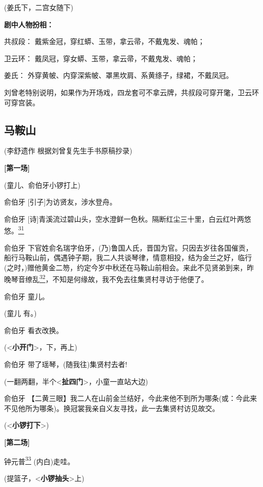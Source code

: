 (姜氏下，二宫女随下)

\textbf{剧中人物扮相：}

共叔段： 戴紫金冠，穿红蟒、玉带，拿云帚，不戴鬼发、魂帕；

卫云环： 戴凤冠，穿女蟒、玉带，拿云帚，不戴鬼发、魂帕；

姜氏： 外穿黄帔、内穿深紫帔、罩黑坎肩、系黄绦子，绿裙，不戴凤冠。

刘曾老特别说明，如果作为开场戏，四龙套可不拿云牌，共叔段可穿开氅，卫云环可穿宫装。

\newpage
\hypertarget{ux9a6cux978dux5c71}{%
\subsection{马鞍山}\label{ux9a6cux978dux5c71}}

(李舒遗作 根据刘曾复先生手书原稿抄录)

\textbf{{[}第一场{]}}

(童儿、俞伯牙小锣打上)

俞伯牙 {[}引子{]}为访贤友，涉水登舟。

俞伯牙
{[}诗{]}青溪流过碧山头，空水澄鲜一色秋。隔断红尘三十里，白云红叶两悠悠。\protect\hyperlink{fn31}{\textsuperscript{31}}

俞伯牙
下官姓俞名瑞字伯牙，(乃)鲁国人氏，晋国为官。只因去岁往各国催贡，船行马鞍山前，偶遇钟子期，我二人共谈琴律，情意相投，结为金兰之好，临行(之时，)赠他黄金二笏，约定今岁中秋还在马鞍山前相会。来此不见贤弟到来，昨晚琴音缭乱\protect\hyperlink{fn32}{\textsuperscript{32}}，不知是何缘故，我不免去往集贤村寻访于他便了。

俞伯牙 童儿。

(童儿 有。)

俞伯牙 看衣改换。

(\textless{}\textbf{小开门}\textgreater{}，下，再上)

俞伯牙 带了瑶琴，(随我往)集贤村去者!

(一翻两翻，半个\textless{}\textbf{扯四门}\textgreater{}，小童一直站大边)

俞伯牙
【二黄三眼】我二人在山前金兰结好，今此来他不到所为哪条(或：今此来不见他所为哪条)。换冠裳我亲自义友寻找，此一去集贤村访见故交。

(\textless{}\textbf{小锣打下}\textgreater{})

\textbf{{[}第二场{]}}

钟元普\protect\hyperlink{fn33}{\textsuperscript{33}} (内白)走哇。

(提篮子，\textless{}\textbf{小锣抽头}\textgreater{}上)

